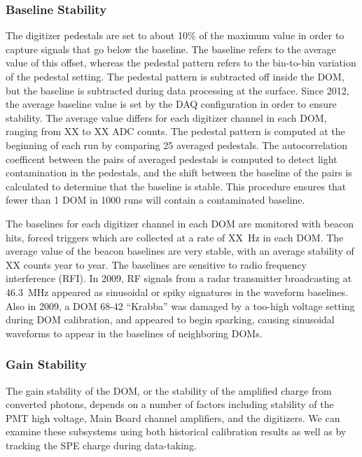 
\subsubsection{Baseline Stability}

The digitizer pedestals are set to about 10\% of the maximum value in
order to capture signals that go below the baseline. The baseline
refers to the average value of this offset, whereas the pedestal
pattern refers to the bin-to-bin variation of the pedestal
setting. The pedestal pattern is subtracted off inside the DOM, but
the baseline is subtracted during data processing at the
surface. Since 2012, the average
baseline value is set by the DAQ configuration in order to ensure
stability. The average value differs for each digitizer channel in
each DOM, ranging from XX to XX ADC counts. The pedestal pattern is computed at the beginning of each
run by comparing 25 averaged pedestals. The autocorrelation coefficent
between the pairs of averaged pedestals is computed to detect light
contamination in the pedestals, and the shift between the baseline of
the pairs is calculated to determine that the baseline is stable. This
procedure ensures that fewer than 1 DOM in 1000 runs will contain a
contaminated baseline.

The baselines for each digitizer channel in each DOM are monitored with
beacon hits, forced triggers which are collected at a rate of XX~Hz in
each DOM. The average value of the beacon baselines are very stable, with an average stability of
XX counts year to year. 
The baselines are sensitive to radio frequency interference (RFI). In
2009, RF signals from a radar transmitter broadcasting at 46.3~MHz
appeared as sinusoidal or spiky signatures in the waveform
baselines. Also in 2009, a DOM 68-42 ``Krabba'' was damaged by a too-high
voltage setting during DOM calibration, and appeared to begin
sparking, causing sinusoidal waveforms to appear in the baselines of
neighboring DOMs.

\subsubsection{Gain Stability}

The gain stability of the DOM, or the stability of the amplified charge
from converted photons, depends on a number of factors including stability
of the PMT high voltage, Main Board channel amplifiers, and the digitizers.
We can examine these subsystems using both historical calibration results
as well as by tracking the SPE charge during data-taking.

